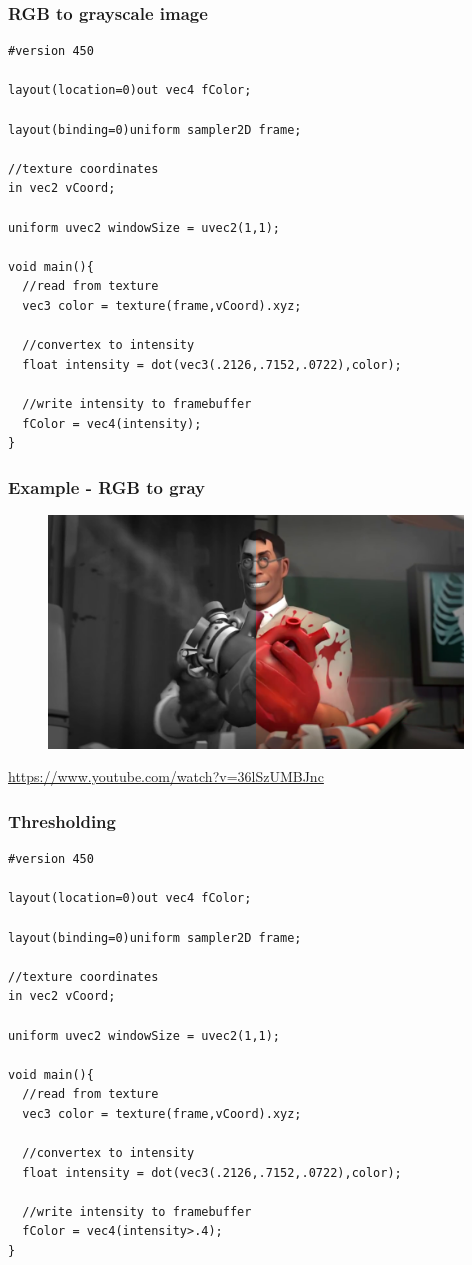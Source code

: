 
\begin{frame}[fragile]
\frametitle{RGB to grayscale image}
  {\scriptsize
  \begin{verbatim}
#version 450

layout(location=0)out vec4 fColor;

layout(binding=0)uniform sampler2D frame;

//texture coordinates
in vec2 vCoord;

uniform uvec2 windowSize = uvec2(1,1);

void main(){
  //read from texture
  vec3 color = texture(frame,vCoord).xyz;

  //convertex to intensity
  float intensity = dot(vec3(.2126,.7152,.0722),color);

  //write intensity to framebuffer
  fColor = vec4(intensity);
}
  \end{verbatim}
  }
\end{frame}

\begin{frame}
\frametitle{Example - RGB to gray}
  \begin{figure}[h]
  \includegraphics[width=11cm,keepaspectratio]{pics/rgb_gray.png}
  \end{figure}
  \url{https://www.youtube.com/watch?v=36lSzUMBJnc}
\end{frame}



\begin{frame}[fragile]
\frametitle{Thresholding}
  {\scriptsize
  \begin{verbatim}
#version 450

layout(location=0)out vec4 fColor;

layout(binding=0)uniform sampler2D frame;

//texture coordinates
in vec2 vCoord;

uniform uvec2 windowSize = uvec2(1,1);

void main(){
  //read from texture
  vec3 color = texture(frame,vCoord).xyz;

  //convertex to intensity
  float intensity = dot(vec3(.2126,.7152,.0722),color);

  //write intensity to framebuffer
  fColor = vec4(intensity>.4);
}
  \end{verbatim}
  }
\end{frame}

